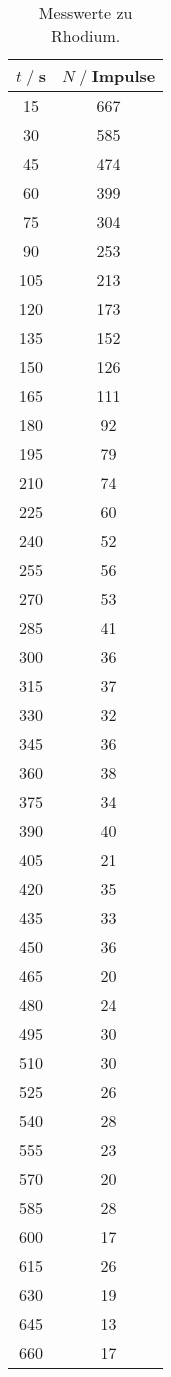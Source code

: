 \begin{table}
    \centering
    \begin{tabular}{c c}
        \toprule
        $t\;/\;$s&$N\;/\;$Impulse\\
        \midrule
        15&	 667\\
        30&	 585\\	 
        45&	 474\\
        60&	 399\\
        75&	 304\\
        90&	 253\\
        105&	 213\\
        120& 173\\
        135&	 152\\
        150&	 126\\
        165&	 111\\
        180&	  92\\
        195&	  79\\
        210&	  74\\
        225&	  60\\
        240&	  52\\
        255&	  56\\
        270&	  53\\
        285&	  41\\
        300&  36\\
        315&	  37\\
        330&	  32\\
        345&	  36\\
        360&	  38\\
        375&	  34\\
        390&	  40\\
        405&	  21\\
        420&	  35\\
        435&	  33\\
        450&	  36\\
        465&	  20\\
        480&	  24\\
        495&	  30\\
        510&	  30\\
        525&	  26\\
        540&	  28\\
        555&	  23\\
        570&	  20\\
        585&	  28\\
        600&	  17\\
        615&	  26\\
        630&	  19\\
        645&	  13\\
        660&	  17\\
        \bottomrule
    \end{tabular}
    \caption{Messwerte zu Rhodium.}
\end{table}
\label{sec:anhang}